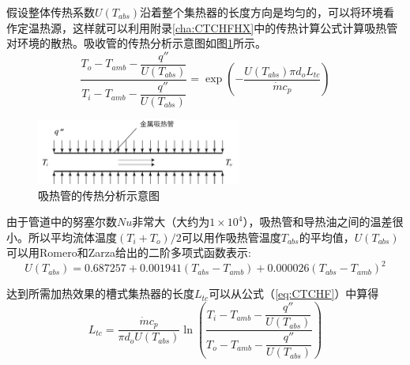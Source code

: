 
假设整体传热系数$U(T_{abs})$沿着整个集热器的长度方向是均匀的，可以将环境看作定温热源，这样就可以利用附录\ref{cha:CTCHFHX}中的传热计算公式计算吸热管对环境的散热。吸收管的传热分析示意图如图\ref{fig:Pipe}所示。
\begin{equation}
	\frac{T_{o}-T_{amb}-\dfrac{q''}{U(T_{abs})}}{T_{i}-T_{amb}-\dfrac{q''}{U(T_{abs})}}=\exp(-\frac{U(T_{abs})\pi d_o L_{tc}}{\dot{m}c_{p}})\label{eq:CTCHF}
\end{equation}

\begin{figure}[!ht]
\centering
\includegraphics[width=0.6\textwidth]{fig/Pipe.pdf}
\caption{吸热管的传热分析示意图}\label{fig:Pipe}
\end{figure}

由于管道中的努塞尔数$Nu$非常大（大约为$1\times10^4$），吸热管和导热油之间的温差很小。所以平均流体温度$(T_{i}+T_{o})/2$可以用作吸热管温度$T_{abs}$的平均值，$U(T_{abs})$可以用Romero和Zarza给出的二阶多项式函数表示\cite{Romero2007}:
\begin{equation}
	U(T_{abs}) = 0.687257 + 0.001941(T_{abs} - T_{amb}) + 0.000026(T_{abs} - T_{amb})^2
\end{equation}

达到所需加热效果的槽式集热器的长度$L_{tc}$可以从公式（\ref{eq:CTCHF}）中算得
\begin{equation}
	L_{tc} = \dfrac{\dot{m}c_p}{\pi d_o U(T_{abs})}\ln\left(\dfrac{T_i-T_{amb}-\dfrac{q''}{U(T_{abs})}}{T_o-T_{amb}-\dfrac{q''}{U(T_{abs})}}\right)
	\label{eq:get_L}
\end{equation}

